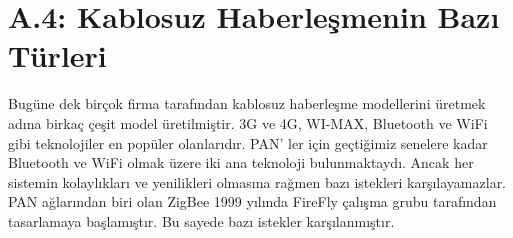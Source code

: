 \clearpage
\section{A.4: Kablosuz Haberleşmenin Bazı Türleri}
\label{CH:AltBolum1.4}

	Bugüne dek birçok firma tarafından kablosuz haberleşme modellerini üretmek adına birkaç çeşit model üretilmiştir. 3G ve 4G, WI-MAX, Bluetooth ve WiFi gibi teknolojiler en popüler olanlarıdır. PAN’ ler için geçtiğimiz senelere kadar Bluetooth ve WiFi olmak üzere iki ana teknoloji bulunmaktaydı. Ancak her sistemin kolaylıkları ve yenilikleri olmasına rağmen bazı istekleri karşılayamazlar. PAN ağlarından biri olan ZigBee 1999 yılında FireFly çalışma grubu tarafından tasarlamaya başlamıştır. Bu sayede bazı istekler karşılanmıştır.
